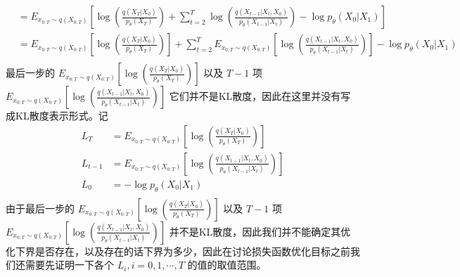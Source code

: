 \documentclass[12pt,a4paper,UTF8]{article}
\begin{document}
\[\begin{aligned}
&=E_{x_{0:T}\sim q\left(X_{0:T}\right)}\left[\log\left(\frac{q\left(X_T|X_0\right)}{p_{\theta}\left(X_T\right)}\right)+\sum\limits_{t=2}^{T}\log\left(\frac{q\left(X_{t-1}|X_t,X_0\right)}{p_{\theta}\left(X_{t-1}|X_t\right)}\right)-\log p_{\theta}\left(X_0|X_1\right)\right]\\
&=E_{x_{0:T}\sim q\left(X_{0:T}\right)}\left[\log\left(\frac{q\left(X_T|X_0\right)}{p_{\theta}\left(X_T\right)}\right)\right]+\sum\limits_{t=2}^{T}E_{x_{0:T}\sim q\left(X_{0:T}\right)}\left[\log\left(\frac{q\left(X_{t-1}|X_t,X_0\right)}{p_{\theta}\left(X_{t-1}|X_t\right)}\right)\right]-\log p_{\theta}\left(X_0|X_1\right)\\
\end{aligned}\]
最后一步的 $E_{x_{0:T}\sim q\left(X_{0:T}\right)}\left[\log\left(\frac{q\left(X_T|X_0\right)}{p_{\theta}\left(X_T\right)}\right)\right]$ 以及 $T-1$ 项 $E_{x_{0:T}\sim q\left(X_{0:T}\right)}\left[\log\left(\frac{q\left(X_{t-1}|X_t,X_0\right)}{p_{\theta}\left(X_{t-1}|X_t\right)}\right)\right]$ 它们并不是KL散度，因此在这里并没有写成KL散度表示形式。记
\[\begin{aligned}
L_T&=E_{x_{0:T}\sim q\left(X_{0:T}\right)}\left[\log\left(\frac{q\left(X_T|X_0\right)}{p_{\theta}\left(X_T\right)}\right)\right]\\
L_{t-1}&=E_{x_{0:T}\sim q\left(X_{0:T}\right)}\left[\log\left(\frac{q\left(X_{t-1}|X_t,X_0\right)}{p_{\theta}\left(X_{t-1}|X_t\right)}\right)\right]\\
L_0&=-\log p_{\theta}\left(X_0|X_1\right)\\
\end{aligned}\]
\indent 由于最后一步的 $E_{x_{0:T}\sim q\left(X_{0:T}\right)}\left[\log\left(\frac{q\left(X_T|X_0\right)}{p_{\theta}\left(X_T\right)}\right)\right]$ 以及 $T-1$ 项 $E_{x_{0:T}\sim q\left(X_{0:T}\right)}\left[\log\left(\frac{q\left(X_{t-1}|X_t,X_0\right)}{p_{\theta}\left(X_{t-1}|X_t\right)}\right)\right]$ 并不是KL散度，因此我们并不能确定其优化下界是否存在，以及存在的话下界为多少，因此在讨论损失函数优化目标之前我们还需要先证明一下各个 $L_i,i=0,1,\cdots,T$ 的值的取值范围。
\end{document}
